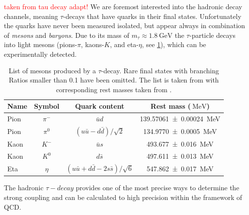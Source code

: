 \documentclass[../../index.tex]{subfiles}
\begin{document}
\textcolor{red}{taken from tau decay adapt!}
We are foremost interested into the hadronic decay channels, meaning
$\tau$-decays that have quarks in their final states. Unfortunately the quarks
have never been measured isolated, but appear always in combination of \textit{mesons}
and \textit{baryons}. Due to its mass of $m_\tau \approx
\SI{1.8}{\giga\electronvolt}$ the $\tau$-particle decays into light mesons
(pions-$\pi$, kaons-$K$, and eta-$\eta$, see \cref{table:lightMesons}), which
can be experimentally detected.
\begin{table}
  \centering
  \begin{tabular}{l c c c}
    \toprule
    Name & Symbol & Quark content & Rest mass ($\SI{}{\mega\electronvolt}$) \\
    \midrule
    Pion & $\pi^-$ & $\bar u d$ & \SI{139.57061 \pm 0.00024}{\mega\electronvolt}  \\
    Pion & $\pi^0$ & $(u \bar u - d \bar d)/\sqrt{2}$ & \SI{134.9770\pm0.0005}{\mega\electronvolt} \\
    Kaon & $K^-$ & $\bar u s$ & \SI{493.677\pm0.016}{\mega\electronvolt} \\
    Kaon & $K^0$ & $d \bar s$ & \SI{497.611\pm0.013}{\mega\electronvolt} \\
    Eta & $\eta$ & $(u \bar u + d \bar d - 2 s \bar s)/\sqrt{6}$ & \SI{547.862\pm0.017}{\mega\electronvolt} \\
  \end{tabular}
  \caption{List of mesons produced by a $\tau$-decay. Rare final states with
    branching Ratios smaller than 0.1 have been omitted. The list is taken from 
    \cite{Davier2006} with corresponding rest masses taken from \cite{PDG2018}.}
  \label{table:lightMesons}
\end{table}

The hadronic $\tau-decay$ provides one of the most precise ways to determine the
strong coupling \cite{Pich2016} and can be calculated to high precision within
the framework of QCD.
\end{document}
